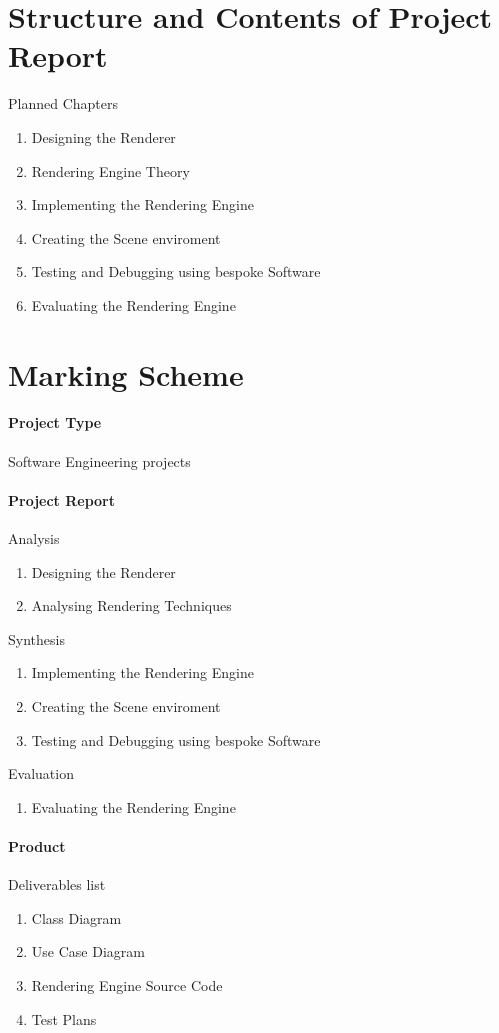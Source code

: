 \documentclass[]{article}
\begin{document}
\section{Structure and Contents of Project Report}
Planned Chapters
\begin{enumerate}
  \item Designing the Renderer
  \item Rendering Engine Theory
  \item Implementing the Rendering Engine
  \item Creating the Scene enviroment
  \item Testing and Debugging using bespoke Software
  \item Evaluating the Rendering Engine
\end{enumerate}

\section{Marking Scheme}
\paragraph{Project Type}Software Engineering projects

\paragraph{Project Report} 
Analysis 
\begin{enumerate}
  \item Designing the Renderer
  \item Analysing Rendering Techniques
\end{enumerate}

Synthesis 
\begin{enumerate}
  \item Implementing the Rendering Engine
  \item Creating the Scene enviroment
  \item Testing and Debugging using bespoke Software
\end{enumerate}

Evaluation
\begin{enumerate}
    \item Evaluating the Rendering Engine
\end{enumerate}


\paragraph{Product}
Deliverables list
\begin{enumerate}
    \item Class Diagram
    \item Use Case Diagram
    \item Rendering Engine Source Code 
    \item Test Plans
\end{enumerate}
\end{document}
